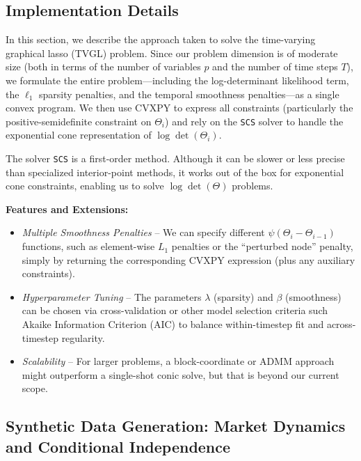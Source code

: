 \documentclass{article}
\begin{document}
\subsection{Implementation Details}
\label{subsec:Implementation Details}


In this section, we describe the approach taken to solve the time-varying graphical lasso (TVGL) problem. 
Since our problem dimension is of moderate size (both in terms of the number of variables $p$ 
and the number of time steps $T$), we formulate the entire problem---including the log-determinant likelihood term, 
the $\ell_1$ sparsity penalties, and the temporal smoothness penalties---as a single convex program. 
We then use CVXPY to express all constraints (particularly the positive-semidefinite constraint on $\Theta_i$) 
and rely on the \texttt{SCS} solver to handle the exponential cone representation of $\log\det(\Theta_i)$. 

The solver \texttt{SCS} is a first-order method. 
Although it can be slower or less precise than specialized interior-point methods, 
it works out of the box for exponential cone constraints, enabling us to solve $\log\det(\Theta)$ problems. 

\vspace{1em}
\noindent
\textbf{Features and Extensions:}
\begin{itemize}
    \item \emph{Multiple Smoothness Penalties} -- We can specify different $\psi(\Theta_i - \Theta_{i-1})$ functions, 
          such as element-wise $L_1$ penalties or the ``perturbed node'' penalty, simply by returning the corresponding 
          CVXPY expression (plus any auxiliary constraints).
    \item \emph{Hyperparameter Tuning} -- The parameters $\lambda$ (sparsity) and $\beta$ (smoothness) 
          can be chosen via cross-validation or other model selection criteria such Akaike Information Criterion (AIC) to balance within-timestep fit and 
          across-timestep regularity.
    \item \emph{Scalability} -- For larger problems, a block-coordinate or ADMM approach might outperform 
          a single-shot conic solve, but that is beyond our current scope.
\end{itemize}



\subsection{Synthetic Data Generation: Market Dynamics and Conditional Independence}
\label{subsec:synthetic_data}
\end{document}
